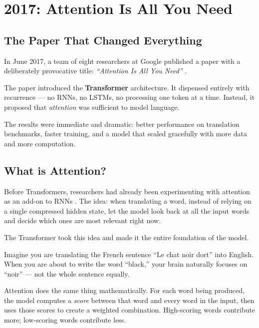 \section{2017: Attention Is All You Need}

\subsection{The Paper That Changed Everything}

In June 2017, a team of eight researchers at Google published a paper with a deliberately provocative title: \emph{``Attention Is All You Need''} \cite{vaswani2017attention}.

The paper introduced the \textbf{Transformer} architecture.
It dispensed entirely with recurrence --- no RNNs, no LSTMs, no processing one token at a time.
Instead, it proposed that \emph{attention} was sufficient to model language.

The results were immediate and dramatic: better performance on translation benchmarks, faster training, and a model that scaled gracefully with more data and more computation.

\subsection{What is Attention?}

Before Transformers, researchers had already been experimenting with attention as an add-on to RNNs \cite{bahdanau2014neural}.
The idea: when translating a word, instead of relying on a single compressed hidden state, let the model look back at all the input words and decide which ones are most relevant right now.

The Transformer took this idea and made it the entire foundation of the model.

\begin{tcolorbox}[colback=blue!5!white, colframe=blue!40!black, title=Attention in Plain English]
Imagine you are translating the French sentence ``Le chat noir dort'' into English.
When you are about to write the word ``black,'' your brain naturally focuses on ``noir'' --- not the whole sentence equally.

Attention does the same thing mathematically.
For each word being produced, the model computes a \emph{score} between that word and every word in the input, then uses those scores to create a weighted combination.
High-scoring words contribute more; low-scoring words contribute less.
\end{tcolorbox}

